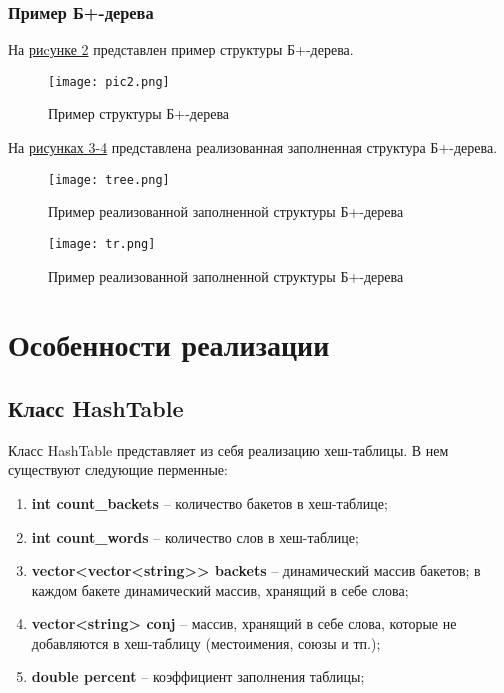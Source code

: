 \documentclass[10pt,a4paper,final]{article} %
\begin{document}
\subsubsection{Пример Б+-дерева}
На \hyperref[fig:pic2]{риcунке 2} представлен пример структуры Б+-дерева. 

\begin{figure}[htbp]
	\centering
	\texttt{[image: pic2.png]}
	\caption{Пример структуры Б+-дерева}
	\label{fig:pic2}
\end{figure}
\newpage

На \hyperref[fig:tree]{рисунках 3-4} представлена реализованная заполненная структура Б+-дерева.

\begin{figure}[htbp]
	\centering
	\texttt{[image: tree.png]}
	\caption{Пример реализованной заполненной структуры Б+-дерева}
	\label{fig:tree}
\end{figure}

\begin{figure}[htbp]
	\centering
	\texttt{[image: tr.png]}
	\caption{Пример реализованной заполненной структуры Б+-дерева}
	\label{fig:tr}
\end{figure}




\newpage
\section{Особенности реализации}

\subsection{Класс HashTable}
 Класс HashTable представляет из себя реализацию хеш-таблицы. В нем существуют следующие перменные:
 \begin{enumerate}
 	
 	\item \textbf{int count\_backets} -- количество бакетов в хеш-таблице;
 	\item \textbf{int count\_words} -- количество слов в хеш-таблице;
 	\item \textbf{vector<vector<string>> backets} -- динамический массив бакетов; в каждом бакете динамический массив, хранящий в себе слова;
 	\item \textbf{vector<string> conj} -- массив, хранящий в себе слова, которые не добавляются в хеш-таблицу (местоимения, союзы и тп.);
 	\item \textbf{double percent} -- коэффициент заполнения таблицы;
 	
 \end{enumerate}
\end{document}
